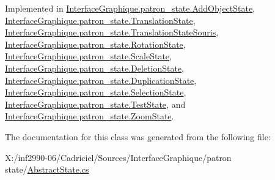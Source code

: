 Implemented in \hyperlink{class_interface_graphique_1_1patron__state_1_1_add_object_state_a5f251f4a42b766f424c3e31af3d181b3}{Interface\-Graphique.\-patron\-\_\-state.\-Add\-Object\-State}, \hyperlink{class_interface_graphique_1_1patron__state_1_1_translation_state_ab5ba5dd1c3941c219f81d01dbcfe2a60}{Interface\-Graphique.\-patron\-\_\-state.\-Translation\-State}, \hyperlink{class_interface_graphique_1_1patron__state_1_1_translation_state_souris_a2370ab1d0a55afefdd46eda17dc13ce6}{Interface\-Graphique.\-patron\-\_\-state.\-Translation\-State\-Souris}, \hyperlink{class_interface_graphique_1_1patron__state_1_1_rotation_state_aa115b089fcafb2b25b8a27f19b55ef31}{Interface\-Graphique.\-patron\-\_\-state.\-Rotation\-State}, \hyperlink{class_interface_graphique_1_1patron__state_1_1_scale_state_af8fe6bca0517beed3c6b9106886d7408}{Interface\-Graphique.\-patron\-\_\-state.\-Scale\-State}, \hyperlink{class_interface_graphique_1_1patron__state_1_1_deletion_state_ab720f529b212ff1b98d5e97f7fcb199f}{Interface\-Graphique.\-patron\-\_\-state.\-Deletion\-State}, \hyperlink{class_interface_graphique_1_1patron__state_1_1_duplication_state_a3e4ab1c3a8bd3d03b822c66d7597e068}{Interface\-Graphique.\-patron\-\_\-state.\-Duplication\-State}, \hyperlink{class_interface_graphique_1_1patron__state_1_1_selection_state_a3c9a95b047d8ef642d0ac7662347f65e}{Interface\-Graphique.\-patron\-\_\-state.\-Selection\-State}, \hyperlink{class_interface_graphique_1_1patron__state_1_1_test_state_ab7aa954cce22801d52158f3d70cbdcac}{Interface\-Graphique.\-patron\-\_\-state.\-Test\-State}, and \hyperlink{class_interface_graphique_1_1patron__state_1_1_zoom_state_aa4608434efc2a14431b08ba9ba071633}{Interface\-Graphique.\-patron\-\_\-state.\-Zoom\-State}.



The documentation for this class was generated from the following file\-:\begin{DoxyCompactItemize}
\item 
X\-:/inf2990-\/06/\-Cadriciel/\-Sources/\-Interface\-Graphique/patron state/\hyperlink{_abstract_state_8cs}{Abstract\-State.\-cs}\end{DoxyCompactItemize}
